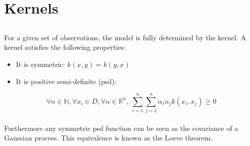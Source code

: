 \documentclass{beamer}
\begin{document}
\section{Kernels}
\subsection{}

\begin{frame}{}
For a given set of observations, the model is fully determined by the kernel.
A kernel satisfies the following properties:
\begin{itemize}
	\item It is symmetric: $k(x,y) = k(y,x)$
	\item It is positive semi-definite (psd):
\end{itemize}
\begin{equation*}
	\forall n \in \mathds{N}, \forall x_i \in D, \forall \alpha \in \mathds{R}^n,\  \sum_{i=1}^n \sum_{j=1}^n \alpha_i \alpha_j k(x_i,x_j) \geq 0
\end{equation*}
\vspace{5mm} \\
Furthermore any symmetric psd function can be seen as the covariance of a Gaussian process. This equivalence is known as the Loeve theorem.
\end{frame}
\end{document}

